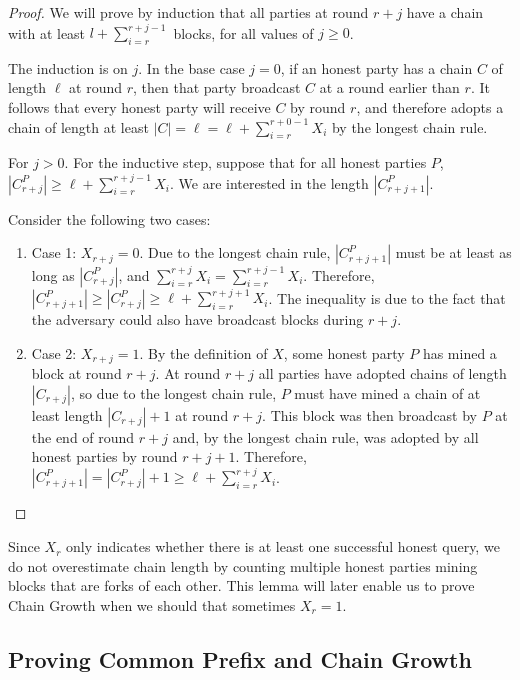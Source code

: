 \begin{proof}
We will prove by induction that all parties at round $r + j$ have a chain with at least $l + \sum_{i=r}^{r + j - 1}$ blocks,
for all values of $j \geq 0$.

The induction is on $j$. In the base case $j=0$,
if an honest party has a chain $C$ of length $\ell$ at round $r$, then that party broadcast $C$ at a round earlier than $r$.
It follows that every honest party will receive $C$ by round $r$, and therefore adopts a chain of length at least
$|C| = \ell = \ell + \sum_{i=r}^{r + 0 - 1} X_i$ by the longest chain rule.

For $j>0$.
For the inductive step, suppose that for all honest parties
$P$, $|C^P_{r+j}| \geq \ell + \sum_{i=r}^{r+j-1} X_i$. We are interested in the length
$|C^P_{r+j+1}|$.

Consider the following two cases:
\begin{enumerate}
\item Case 1: $X_{r+j} = 0$. Due to the longest chain rule, $|C^P_{r + j + 1}|$ must be at least as long as $|C^P_{r+j}|$, and $\sum_{i=r}^{r+j} X_i = \sum_{i=r}^{r+j - 1} X_i$. Therefore, $|C^P_{r+j+1}| \geq |C^P_{r+j}| \geq \ell + \sum_{i=r}^{r + j + 1} X_i$. The inequality is due to the fact that the adversary could also have broadcast blocks during $r+j$.
\item Case 2: $X_{r+j} = 1$. By the definition of $X$, some honest party $P$ has mined a block at round $r+j$. At round $r + j$ all parties have adopted chains of length $|C_{r+j}|$, so due to the longest chain rule, $P$ must have mined a chain of at least length $|C_{r+j}| + 1$ at round $r + j$. This block was then broadcast by $P$ at the end of round $r+j$ and, by the longest chain rule, was adopted by all honest parties by round $r+j+1$. Therefore, $|C^P_{r + j + 1}| = |C^P_{r + j}| + 1 \geq \ell + \sum_{i=r}^{r + j} X_i$.
\end{enumerate}
\end{proof}

Since $X_r$ only indicates whether there is at least one successful honest query, we do not overestimate chain length by counting multiple honest parties mining blocks that are forks of each other. This lemma will later enable us to prove Chain Growth when we should that sometimes $X_r = 1$.

\subsection{Proving Common Prefix and Chain Growth}

